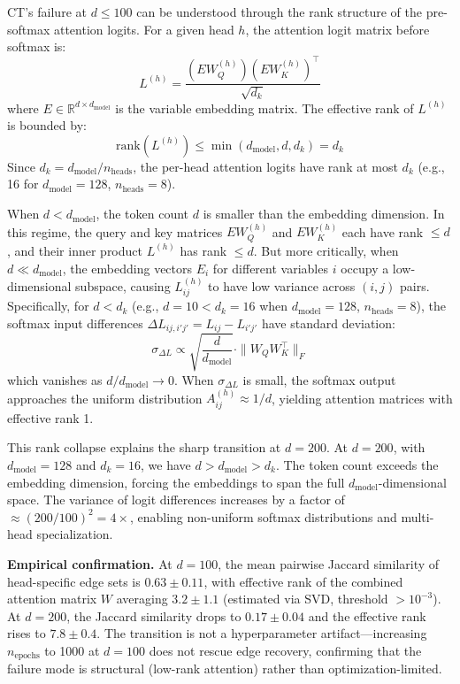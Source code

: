 \documentclass[12pt,a4paper]{article}
\begin{document}
CT's failure at $d \le 100$ can be understood through the rank structure of the pre-softmax attention logits. For a given head $h$, the attention logit matrix before softmax is:
\begin{equation}
    L^{(h)} = \frac{(E W_Q^{(h)})(E W_K^{(h)})^\top}{\sqrt{d_k}}
\end{equation}
where $E \in \mathbb{R}^{d \times d_{\text{model}}}$ is the variable embedding matrix. The effective rank of $L^{(h)}$ is bounded by:
\begin{equation}
    \text{rank}(L^{(h)}) \le \min(d_{\text{model}}, d, d_k) = d_k
\end{equation}
Since $d_k = d_{\text{model}} / n_{\text{heads}}$, the per-head attention logits have rank at most $d_k$ (e.g., 16 for $d_{\text{model}}=128$, $n_{\text{heads}}=8$).

When $d < d_{\text{model}}$, the token count $d$ is smaller than the embedding dimension. In this regime, the query and key matrices $E W_Q^{(h)}$ and $E W_K^{(h)}$ each have rank $\le d$, and their inner product $L^{(h)}$ has rank $\le d$. But more critically, when $d \ll d_{\text{model}}$, the embedding vectors $E_i$ for different variables $i$ occupy a low-dimensional subspace, causing $L_{ij}^{(h)}$ to have low variance across $(i,j)$ pairs. Specifically, for $d < d_k$ (e.g., $d=10 < d_k=16$ when $d_{\text{model}}=128$, $n_{\text{heads}}=8$), the softmax input differences $\Delta L_{ij,i'j'} = L_{ij} - L_{i'j'}$ have standard deviation:
\begin{equation}
    \sigma_{\Delta L} \propto \sqrt{\frac{d}{d_{\text{model}}}} \cdot \|W_Q W_K^\top\|_F
\end{equation}
which vanishes as $d / d_{\text{model}} \to 0$. When $\sigma_{\Delta L}$ is small, the softmax output approaches the uniform distribution $A_{ij}^{(h)} \approx 1/d$, yielding attention matrices with effective rank 1.

This rank collapse explains the sharp transition at $d=200$. At $d=200$, with $d_{\text{model}}=128$ and $d_k=16$, we have $d > d_{\text{model}} > d_k$. The token count exceeds the embedding dimension, forcing the embeddings to span the full $d_{\text{model}}$-dimensional space. The variance of logit differences increases by a factor of $\approx (200/100)^2 = 4\times$, enabling non-uniform softmax distributions and multi-head specialization.

\textbf{Empirical confirmation.} At $d=100$, the mean pairwise Jaccard similarity of head-specific edge sets is $0.63 \pm 0.11$, with effective rank of the combined attention matrix $W$ averaging $3.2 \pm 1.1$ (estimated via SVD, threshold $>10^{-3}$). At $d=200$, the Jaccard similarity drops to $0.17 \pm 0.04$ and the effective rank rises to $7.8 \pm 0.4$. The transition is not a hyperparameter artifact---increasing $n_{\text{epochs}}$ to 1000 at $d=100$ does not rescue edge recovery, confirming that the failure mode is structural (low-rank attention) rather than optimization-limited.
\end{document}
